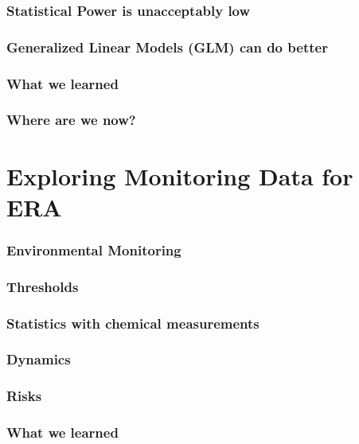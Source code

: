 \documentclass[10pt
	]{beamer}
\begin{document}
\begin{frame}
\frametitle{Statistical Power is unacceptably low}

\end{frame}


\begin{frame}
\frametitle{Generalized Linear Models (GLM) can do better}

\end{frame}



\begin{frame}
\frametitle{What we learned}

\end{frame}


\begin{frame}
\frametitle{Where are we now?}

\end{frame}

\section{Exploring Monitoring Data for ERA}

\begin{frame}
\frametitle{Environmental Monitoring}

\end{frame}

\begin{frame}
\frametitle{Thresholds}

\end{frame}

\begin{frame}
\frametitle{Statistics with chemical measurements}

\end{frame}


\begin{frame}
\frametitle{Dynamics}

\end{frame}


\begin{frame}
\frametitle{Risks}

\end{frame}


\begin{frame}
\frametitle{What we learned}

\end{frame}
\end{document}
